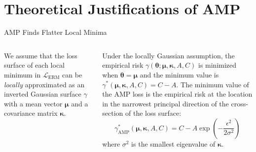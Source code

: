 \section{Theoretical Justifications of AMP}


\begin{frame}{AMP Finds Flatter Local Minima}

\begin{columns}

We assume that the loss surface of each local minimum in $\mathcal{L}_\mathrm{ERM}$ can be {\em locally} approximated as an inverted Gaussian surface $\gamma$ with a mean vector $\boldsymbol{\mu}$ and a covariance matrix $\boldsymbol{\kappa}$.
\begin{theorem}[informal]
Under the locally Gaussian assumption, the empirical risk $\gamma(\boldsymbol{\theta};\boldsymbol{\mu},\boldsymbol{\kappa},A,C)$ is minimized when $\boldsymbol{\theta}=\boldsymbol{\mu}$ and the minimum value is $\gamma^\ast(\boldsymbol{\mu},\boldsymbol{\kappa},A,C)=C-A$. The minimum value of the AMP loss is the empirical risk at the location in the narrowest principal direction of the cross-section of the loss surface:
\begin{equation}
\gamma_\mathrm{AMP}^\ast(\boldsymbol{\mu},\boldsymbol{\kappa},A,C)=C-A\exp\left(-\frac{\epsilon^2}{2\sigma^2}\right)
\end{equation}
where $\sigma^2$ is the smallest eigenvalue of $\boldsymbol{\kappa}$.
\end{theorem}



\end{columns}
\end{frame}
